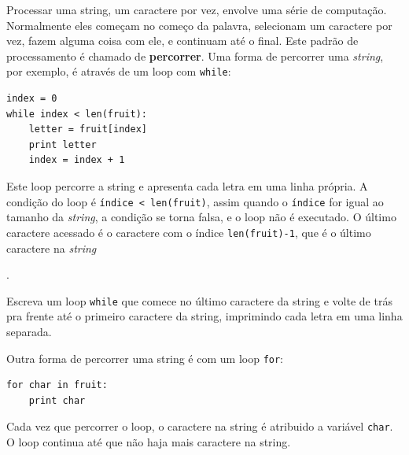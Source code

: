 {{%
Processar uma string, um caractere por vez, envolve uma série de computação.
Normalmente eles começam no começo da palavra, selecionam um caractere por
vez, fazem alguma coisa com ele, e continuam até o final. Este padrão de
processamento é chamado de {\bf percorrer}. Uma forma de percorrer uma 
{\it string}, por exemplo, é através de um loop com {\tt while}:

\beforeverb
\begin{verbatim}
index = 0
while index < len(fruit):
    letter = fruit[index]
    print letter
    index = index + 1
\end{verbatim}
\afterverb
%
%
Este loop percorre a string e apresenta cada letra em uma linha própria. A
condição do loop é {\tt índice < len(fruit)}, assim quando o {\tt índice} for
igual ao tamanho da {\it string}, a condição se torna falsa, e o loop não é
executado. O último caractere acessado é o caractere com o índice
{\tt len(fruit)-1}, que é o último caractere na {\it string}}.

\begin{ex}
Escreva um loop {\tt while} que comece no último caractere da string e volte
de trás pra frente até o primeiro caractere da string, imprimindo cada letra
em uma linha separada.
\end{ex}

Outra forma de percorrer uma string é com um loop {\tt for}:

\beforeverb
\begin{verbatim}
for char in fruit:
    print char
\end{verbatim}
\afterverb
%
Cada vez que percorrer o loop, o caractere na string é atribuido a variável 
{\tt char}. O loop continua até que não haja mais caractere na string.


}
